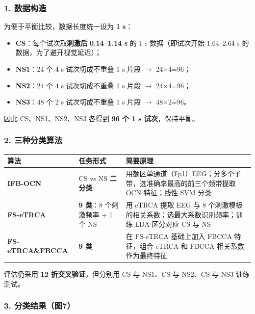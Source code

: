 \documentclass[12pt, a4paper]{ctexart}
\begin{document}
\subsubsection*{1. 数据构造}

为便于平衡比较，数据长度统一设为 \textbf{1 s}：

\begin{itemize}
  \item \textbf{CS}：每个试次取\textbf{刺激后} \textbf{0.14--1.14 s} 的 1 s 数据（即试次开始 1.64--2.64 s 的数据，为了避开视觉延迟）；
  \item \textbf{NS1}：24 个 4 s 试次切成不重叠 1 s 片段 $\rightarrow$ 24$\times$4=96；
  \item \textbf{NS2}：24 个 4 s 试次切成不重叠 1 s 片段 $\rightarrow$ 24$\times$4=96；
  \item \textbf{NS3}：48 个 2 s 试次切成不重叠 1 s 片段 $\rightarrow$ 48$\times$2=96。
\end{itemize}

因此 CS、NS1、NS2、NS3 各得到 \textbf{96 个 1 s 试次}，保持平衡。

\subsubsection*{2. 三种分类算法}

\begin{table}[h]
\centering\footnotesize
\begin{tabularx}{\textwidth}{llY}
\toprule
\textbf{算法} & \textbf{任务形式} & \textbf{简要原理} \\
\midrule
\textbf{IFB-OCN} & CS vs NS \textbf{二分类} & 用额区单通道（Fp1）EEG；分多个子带，选准确率最高的前三个频带提取 OCN 特征；线性 SVM 分类 \\
\textbf{FS-eTRCA} & \textbf{9 类}：8 个刺激频率 + 1 个 NS & 用 eTRCA 提取 EEG 与 8 个刺激模板的相关系数；选最大系数识别频率；训练 LDA 区分对应 CS 与 NS \\
\textbf{FS-eTRCA\&FBCCA} & \textbf{9 类} & 在 FS-eTRCA 基础上加入 FBCCA 特征，组合 eTRCA 和 FBCCA 相关系数作为最终特征 \\
\bottomrule
\end{tabularx}
\end{table}

评估仍采用 \textbf{12 折交叉验证}，但分别用 CS 与 NS1、CS 与 NS2、CS 与 NS3 训练测试。

\subsubsection*{3. 分类结果（图7）}
\end{document}
